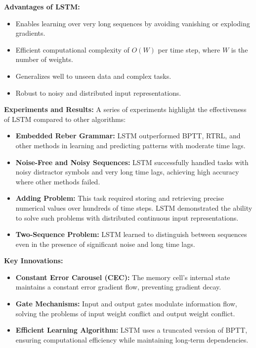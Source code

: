 \documentclass{article}
\begin{document}
\textbf{Advantages of LSTM:}
\begin{itemize}
    \item Enables learning over very long sequences by avoiding vanishing or exploding gradients.
    \item Efficient computational complexity of $O(W)$ per time step, where $W$ is the number of weights.
    \item Generalizes well to unseen data and complex tasks.
    \item Robust to noisy and distributed input representations.
\end{itemize}

\textbf{Experiments and Results:} A series of experiments highlight the effectiveness of LSTM compared to other algorithms:
\begin{itemize}
    \item \textbf{Embedded Reber Grammar:} LSTM outperformed BPTT, RTRL, and other methods in learning and predicting patterns with moderate time lags.
    \item \textbf{Noise-Free and Noisy Sequences:} LSTM successfully handled tasks with noisy distractor symbols and very long time lags, achieving high accuracy where other methods failed.
    \item \textbf{Adding Problem:} This task required storing and retrieving precise numerical values over hundreds of time steps. LSTM demonstrated the ability to solve such problems with distributed continuous input representations.
    \item \textbf{Two-Sequence Problem:} LSTM learned to distinguish between sequences even in the presence of significant noise and long time lags.
\end{itemize}

\textbf{Key Innovations:}
\begin{itemize}
    \item \textbf{Constant Error Carousel (CEC):} The memory cell's internal state maintains a constant error gradient flow, preventing gradient decay.
    \item \textbf{Gate Mechanisms:} Input and output gates modulate information flow, solving the problems of input weight conflict and output weight conflict.
    \item \textbf{Efficient Learning Algorithm:} LSTM uses a truncated version of BPTT, ensuring computational efficiency while maintaining long-term dependencies.
\end{itemize}
\end{document}
